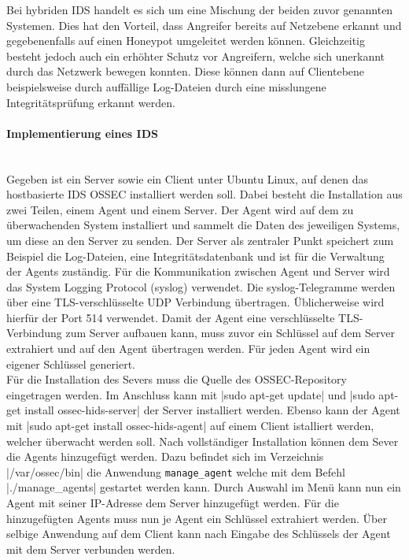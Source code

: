 \noindent Bei hybriden IDS handelt es sich um eine Mischung der beiden zuvor genannten Systemen. Dies hat den Vorteil, dass Angreifer bereits auf Netzebene erkannt und gegebenenfalls auf einen Honeypot umgeleitet werden können. Gleichzeitig besteht jedoch auch ein erhöhter Schutz vor Angreifern, welche sich unerkannt durch das Netzwerk bewegen konnten. Diese können dann auf Clientebene beispielsweise durch auffällige Log-Dateien durch eine misslungene Integritätsprüfung erkannt werden.\\

\paragraph{Implementierung eines IDS}
\noindent \\Gegeben ist ein Server sowie ein Client unter Ubuntu Linux, auf denen das hostbasierte IDS OSSEC installiert werden soll. Dabei besteht die Installation aus zwei Teilen, einem Agent und einem Server. Der Agent wird auf dem zu überwachenden System installiert und sammelt die Daten des jeweiligen Systems, um diese an den Server zu senden. Der Server als zentraler Punkt speichert zum Beispiel die Log-Dateien, eine Integritätsdatenbank und ist für die Verwaltung der Agents zuständig. Für die Kommunikation zwischen Agent und Server wird das System Logging Protocol (syslog) verwendet. Die syslog-Telegramme werden über eine TLS-verschlüsselte UDP Verbindung übertragen. Üblicherweise wird hierfür der Port 514 verwendet. Damit der Agent eine verschlüsselte TLS-Verbindung zum Server aufbauen kann, muss zuvor ein Schlüssel auf dem Server extrahiert und auf den Agent übertragen werden. Für jeden Agent wird ein eigener Schlüssel generiert. \\

\noindent Für die Installation des Severs muss die Quelle des OSSEC-Repository eingetragen werden. Im Anschluss kann mit |sudo apt-get update| und |sudo apt-get install ossec-hids-server| der Server installiert werden. 
Ebenso kann der Agent mit |sudo apt-get install ossec-hids-agent| auf einem Client istalliert werden, welcher überwacht werden soll. Nach vollständiger Installation können dem Sever die Agents hinzugefügt werden. Dazu befindet sich im Verzeichnis |/var/ossec/bin| die Anwendung \verb+manage_agent+ welche mit dem Befehl |./manage_agents| gestartet werden kann. 
Durch Auswahl im Menü kann nun ein Agent mit seiner IP-Adresse dem Server hinzugefügt werden. Für die hinzugefügten Agents muss nun je Agent ein Schlüssel extrahiert werden. Über selbige Anwendung auf dem Client kann nach Eingabe des Schlüssels der Agent mit dem Server verbunden werden.\\

